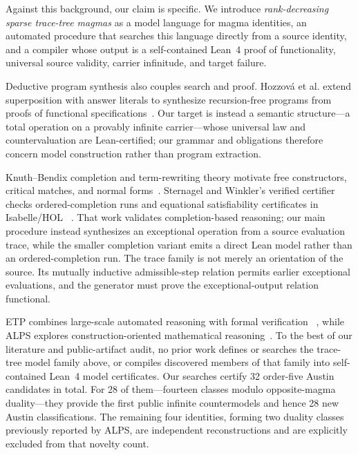 \documentclass[runningheads]{llncs}
\begin{document}
Against this background, our claim is specific.  We introduce
\emph{rank-decreasing sparse trace-tree magmas} as a model language for magma
identities, an automated procedure that searches this language directly from a
source identity, and a compiler whose output is a self-contained Lean~4 proof
of functionality, universal source validity, carrier infinitude, and target
failure.

Deductive program synthesis also couples search and proof.  Hozzov\'a et al.
extend superposition with answer literals to synthesize recursion-free
programs from proofs of functional specifications~\cite{HozzovaEtAl2023}.
Our target is instead a semantic structure---a total operation on a provably
infinite carrier---whose universal law and countervaluation are Lean-certified;
our grammar and obligations therefore concern model construction rather than
program extraction.

Knuth--Bendix completion and term-rewriting theory motivate free constructors,
critical matches, and normal forms~\cite{KnuthBendix1970,BaaderNipkow1998}.
Sternagel and Winkler's verified certifier checks ordered-completion runs and
equational satisfiability certificates in Isabelle/HOL
~\cite{SternagelWinkler2019}.  That work validates completion-based reasoning;
our main procedure instead synthesizes an exceptional operation from a source
evaluation trace, while the smaller completion variant emits a direct Lean
model rather than an ordered-completion run.
The trace family is not merely an orientation of the source.  Its mutually
inductive admissible-step relation permits earlier exceptional evaluations,
and the generator must prove the exceptional-output relation functional.

ETP combines large-scale automated reasoning with formal verification
~\cite{BolanEtAl2025}, while ALPS explores construction-oriented mathematical
reasoning~\cite{XieEtAl2026ALPS}.  To the best of our literature and
public-artifact audit, no prior work defines or searches the trace-tree model
family above, or compiles discovered members of that family into self-contained
Lean~4 model certificates.  Our searches certify 32 order-five Austin
candidates in total.  For 28 of them---fourteen classes modulo opposite-magma
duality---they provide the first public infinite countermodels and hence 28 new
Austin classifications.  The remaining four identities, forming two duality
classes previously reported by ALPS, are independent reconstructions and are
explicitly excluded from that novelty count.
\end{document}
